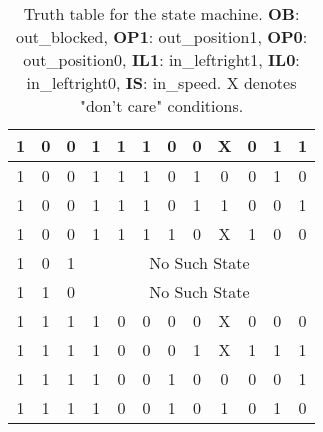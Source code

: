 \begin{table}[H]
\begin{tabular}{|c|c|c|c|c|c|c|c|c|c|c|c|}
        1  & 0  & 0  & 1  & 1   & 1   & 0   & 0   & X  & 0  & 1  & 1  \\ \hline
        1  & 0  & 0  & 1  & 1   & 1   & 0   & 1   & 0  & 0  & 1  & 0  \\ \hline
        1  & 0  & 0  & 1  & 1   & 1   & 0   & 1   & 1  & 0  & 0  & 1  \\ \hline
        1  & 0  & 0  & 1  & 1   & 1   & 1   & 0   & X  & 1  & 0  & 0  \\ \hline
        1  & 0  & 1  & \multicolumn{9}{c|}{No Such State}                \\ \hline
        1  & 1  & 0  & \multicolumn{9}{c|}{No Such State}                \\ \hline
        1  & 1  & 1  & 1  & 0   & 0   & 0   & 0   & X  & 0  & 0  & 0  \\ \hline
        1  & 1  & 1  & 1  & 0   & 0   & 0   & 1   & X  & 1  & 1  & 1  \\ \hline
        1  & 1  & 1  & 1  & 0   & 0   & 1   & 0   & 0  & 0  & 0  & 1  \\ \hline
        1  & 1  & 1  & 1  & 0   & 0   & 1   & 0   & 1  & 0  & 1  & 0  \\ \hline
    \end{tabular}
    \caption{Truth table for the state machine. \textbf{OB}: out\_blocked, \textbf{OP1}: out\_position1, \textbf{OP0}: out\_position0, \textbf{IL1}: in\_leftright1, \textbf{IL0}: in\_leftright0, \textbf{IS}: in\_speed. X denotes "don't care" conditions.}
    \label{tab:truth_table}
\end{table}


